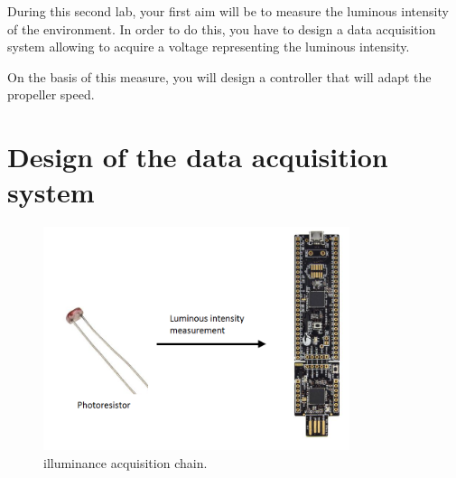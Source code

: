 \documentclass[11pt,a4paper]{article}
\theoremstyle{definition}%
\begin{document}
During this second lab, your first aim will be to measure the luminous intensity of the environment.
In order to do this, you have to design a data acquisition system allowing to acquire a voltage representing the luminous intensity.

On the basis of this measure, you will design a controller that will adapt the propeller speed.









\section{Design of the data acquisition system}

\begin{figure}[H]
\center
\includegraphics[width=0.8\textwidth]{acquisition}
\caption{illuminance acquisition chain.}
\label{fig:acquisition}
\end{figure}
\end{document}
